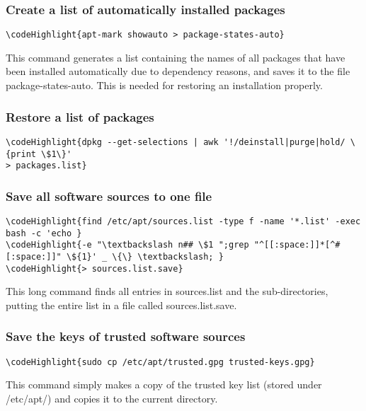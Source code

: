 \documentclass[12pt,a4paper]{article}
\begin{document}
\subsubsection{Create a list of automatically installed packages}
\begin{Verbatim}[commandchars=\\\{\}]
\codeHighlight{apt-mark showauto > package-states-auto}
\end{Verbatim}
This command generates a list containing the names of all packages that have been installed automatically due to dependency reasons, and saves it to the file package-states-auto.  This is needed for restoring an installation properly.

\subsubsection{Restore a list of packages}
\begin{Verbatim}[commandchars=\\\{\}]
\codeHighlight{dpkg --get-selections | awk '!/deinstall|purge|hold/ \{print \$1\}'
> packages.list}
\end{Verbatim}

\subsubsection{Save all software sources to one file}
\begin{Verbatim}[commandchars=\\\{\}]
\codeHighlight{find /etc/apt/sources.list -type f -name '*.list' -exec bash -c 'echo }
\codeHighlight{-e "\textbackslash n## \$1 ";grep "^[[:space:]]*[^#[:space:]]" \${1}' _ \{\} \textbackslash; }
\codeHighlight{> sources.list.save}
\end{Verbatim}
This long command finds all entries in sources.list and the sub-directories, putting the entire list in a file called sources.list.save.

\subsubsection{Save the keys of trusted software sources}
\begin{Verbatim}[commandchars=\\\{\}]
\codeHighlight{sudo cp /etc/apt/trusted.gpg trusted-keys.gpg}
\end{Verbatim}
This command simply makes a copy of the trusted key list (stored under /etc/apt/) and copies it to the current directory.
\end{document}
